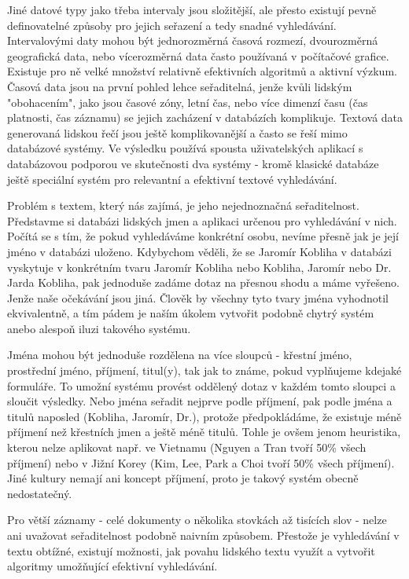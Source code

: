 \documentclass[12pt]{article}
\begin{document}
Jiné datové typy jako třeba intervaly jsou složitější, ale přesto existují
pevně definovatelné způsoby pro jejich seřazení a tedy snadné vyhledávání.
Intervalovými daty mohou být jednorozměrná časová rozmezí, dvourozměrná
geografická data, nebo vícerozměrná data často používaná v počítačové grafice.
Existuje pro ně velké množství relativně efektivních algoritmů a aktivní
výzkum. Časová data jsou na první pohled lehce seřaditelná, jenže kvůli lidským
"obohacením", jako jsou časové zóny, letní čas, nebo více dimenzí času (čas
platnosti, čas záznamu) se jejich zacházení v databázích komplikuje. Textová
data generovaná lidskou řečí jsou ještě komplikovanější a často se řeší mimo
databázové systémy. Ve výsledku používá spousta uživatelských aplikací s
databázovou podporou ve skutečnosti dva systémy - kromě klasické databáze ještě
speciální systém pro relevantní a efektivní textové vyhledávání.

Problém s textem, který nás zajímá, je jeho nejednoznačná seřaditelnost.
Představme si databázi lidských jmen a aplikaci určenou pro vyhledávání v nich.
Počítá se s tím, že pokud vyhledáváme konkrétní osobu, nevíme přesně jak je
její jméno v databázi uloženo. Kdybychom věděli, že se Jaromír Kobliha v
databázi vyskytuje v konkrétním tvaru Jaromír Kobliha nebo Kobliha, Jaromír
nebo Dr. Jarda Kobliha, pak jednoduše zadáme dotaz na přesnou shodu a máme
vyřešeno. Jenže naše očekávání jsou jiná. Člověk by všechny tyto tvary jména
vyhodnotil ekvivalentně, a tím pádem je naším úkolem vytvořit podobně chytrý
systém anebo alespoň iluzi takového systému. 

Jména mohou být jednoduše rozdělena na více sloupců - křestní jméno, prostřední
jméno, příjmení, titul(y), tak jak to známe, pokud vyplňujeme kdejaké
formuláře. To umožní systému provést oddělený dotaz v každém tomto sloupci a
sloučit výsledky. Nebo jména seřadit nejprve podle příjmení, pak podle jména a
titulů naposled (Kobliha, Jaromír, Dr.), protože předpokládáme, že existuje
méně příjmení než křestních jmen a ještě méně titulů. Tohle je ovšem jenom
heuristika, kterou nelze aplikovat např. ve Vietnamu (Nguyen a Tran tvoří 50\%
všech příjmení) nebo v Jižní Korey (Kim, Lee, Park a Choi tvoří 50\% všech
příjmení). Jiné kultury nemají ani koncept příjmení, proto je takový systém
obecně nedostatečný.

Pro větší záznamy - celé dokumenty o několika stovkách až tisících slov - nelze
ani uvažovat seřaditelnost podobně naivním způsobem. Přestože je vyhledávání v
textu obtížné, existují možnosti, jak povahu lidského textu využít a vytvořit
algoritmy umožňující efektivní vyhledávání.
\end{document}

